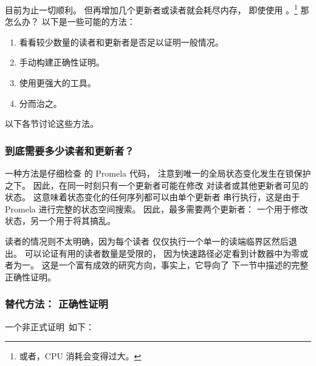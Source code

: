 目前为止一切顺利。
但再增加几个更新者或读者就会耗尽内存，
即使使用 。\footnote{
	或者，CPU 消耗会变得过大。}
那怎么办？
以下是一些可能的方法：

\begin{enumerate}
\item	看看较少数量的读者和更新者是否足以证明一般情况。
\item	手动构建正确性证明。
\item	使用更强大的工具。
\item	分而治之。
\end{enumerate}

以下各节讨论这些方法。

\subsubsection{到底需要多少读者和更新者？}
\label{sec:formal:How Many Readers and Updaters Are Really Needed?}

一种方法是仔细检查  的 Promela 代码，
注意到唯一的全局状态变化发生在锁保护之下。
因此，在同一时刻只有一个更新者可能在修改
对读者或其他更新者可见的状态。
这意味着状态变化的任何序列都可以由单个更新者
串行执行，这是由于 Promela 进行完整的状态空间搜索。
因此，最多需要两个更新者：
一个用于修改状态，另一个用于将其搞乱。

读者的情况则不太明确，因为每个读者
仅仅执行一个单一的读端临界区然后退出。
可以论证有用的读者数量是受限的，
因为快速路径必定看到计数器中为零或者为一。
这是一个富有成效的研究方向，事实上，它导向了
下一节中描述的完整正确性证明。

\subsubsection{替代方法：
				     正确性证明}
\label{sec:formal:Alternative Approach: Proof of Correctness}

一个非正式证明~\cite{PaulMcKenney2007QRCUpatch}如下：

